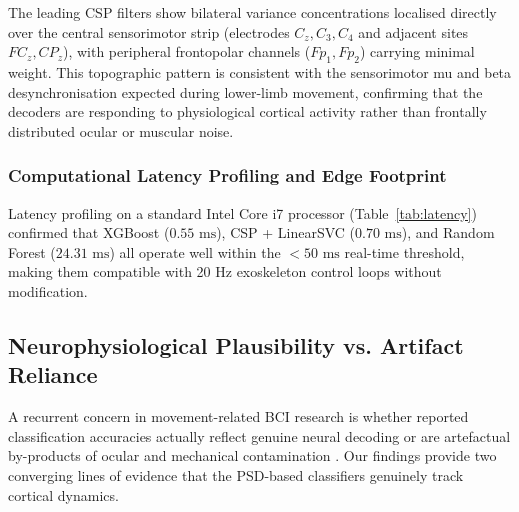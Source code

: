\documentclass[11pt,a4paper]{article}
\renewcommand{\arraystretch}{1.15}
\begin{document}
The leading CSP filters show bilateral variance concentrations localised directly over the central sensorimotor strip (electrodes $C_z, C_3, C_4$ and adjacent sites $FC_z, CP_z$), with peripheral frontopolar channels ($Fp_1, Fp_2$) carrying minimal weight. This topographic pattern is consistent with the sensorimotor mu and beta desynchronisation expected during lower-limb movement, confirming that the decoders are responding to physiological cortical activity rather than frontally distributed ocular or muscular noise.

\subsubsection{Computational Latency Profiling and Edge Footprint}
Latency profiling on a standard Intel Core i7 processor (Table~\ref{tab:latency}) confirmed that XGBoost ($0.55\text{ ms}$), CSP + LinearSVC ($0.70\text{ ms}$), and Random Forest ($24.31\text{ ms}$) all operate well within the $<50\text{ ms}$ real-time threshold, making them compatible with 20 Hz exoskeleton control loops without modification.

\begin{table}[htbp]
\centering
\caption{Inference Latency Benchmark and Real-Time Closed-Loop Compliance}
\label{tab:latency}
\vspace{0.4em}
\renewcommand{\arraystretch}{1.25}
\end{table}

\label{sec:discussion}

\subsection{Neurophysiological Plausibility vs. Artifact Reliance}
A recurrent concern in movement-related BCI research is whether reported classification accuracies actually reflect genuine neural decoding or are artefactual by-products of ocular and mechanical contamination \cite{castermans2014accidental, tanner2023artifacts}. Our findings provide two converging lines of evidence that the PSD-based classifiers genuinely track cortical dynamics.
\end{document}
